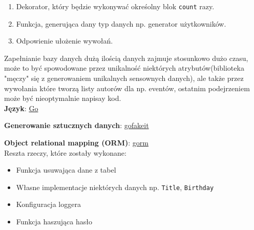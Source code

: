 \documentclass{article}
\begin{document}
\begin{enumerate}
    \item Dekorator, który będzie wykonywać okreśolny blok \texttt{count} razy.
    \item Funkcja, generująca dany typ danych np. generator użytkowników.
    \item Odpowienie ułożenie wywołań.
\end{enumerate}

Zapełnianie bazy danych dużą ilością danych zajmuje stosunkowo dużo czasu, może to być spowodowane przez unikalność niektórych atrybutów(biblioteka "męczy" się z generowaniem unikalnych sensownych danych), ale także przez wywołania które tworzą listy autorów dla np. eventów, ostatnim podejrzeniem może być nieoptymalnie napisay kod. \\ 


\textbf{Język}: \href{https://go.dev/}{Go} 

\textbf{Generowanie sztucznych danych}: \href{https://github.com/brianvoe/gofakeit}{gofakeit} 

\textbf{Object relational mapping (ORM)}: \href{https://github.com/go-gorm/gorm}{gorm} \\

Reszta rzeczy, które zostały wykonane:

\begin{itemize}
    \item Funkcja usuwająca dane z tabel
    \item Własne implementacje niektórych danych np. \texttt{Title}, \texttt{Birthday} 
    \item Konfiguracja loggera 
    \item Funkcja haszująca hasło 
\end{itemize}
\end{document}

